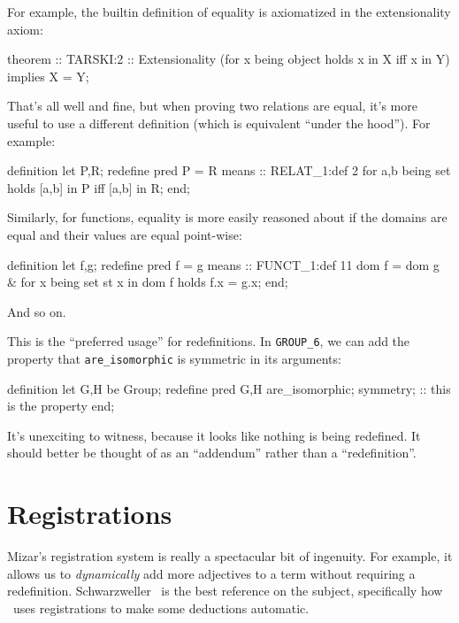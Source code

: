 \begin{node}[Redefinitions]
\begin{node}\label{mizar-001Q}%
For example, the builtin definition of equality is axiomatized in the
extensionality axiom:
\begin{mizar}
theorem :: TARSKI:2 :: Extensionality
  (for x being object holds x in X iff x in Y) implies X = Y;
\end{mizar}
That's all well and fine, but when proving two relations are equal, it's
more useful to use a different definition (which is equivalent ``under
the hood''). For example:
\begin{mizar}
definition
  let P,R;
  redefine pred P = R means
:: RELAT_1:def 2
  for a,b being set holds [a,b] in P iff [a,b] in R;
end;
\end{mizar}
Similarly, for functions, equality is more easily reasoned about if the
domains are equal and their values are equal point-wise:
\begin{mizar}
definition
  let f,g;
  redefine pred f = g means
:: FUNCT_1:def 11
  dom f = dom g
  & for x being set st x in dom f holds f.x = g.x;
end;
\end{mizar}
And so on.
\end{node}

\begin{node}\label{mizar-001R}%
This is the ``preferred usage'' for redefinitions. In \verb|GROUP_6|, we
can add the property that \verb|are_isomorphic| is symmetric in its
arguments:
\begin{mizar}
definition
  let G,H be Group;
  redefine pred G,H are_isomorphic;
  symmetry; :: this is the property
end;
\end{mizar}
It's unexciting to witness, because it looks like nothing is being
redefined. It should better be thought of as an ``addendum'' rather than
a ``redefinition''.
\end{node}
\end{node}

\section{Registrations}

\begin{node}\label{mizar-001U}%
Mizar's registration system is really a spectacular bit of ingenuity. 
For example, it allows us to \emph{dynamically} add more adjectives to a
term without requiring a redefinition.
Schwarzweller~\cite{schwarzweller2007mizar} is the best reference on the
subject, specifically how \Mizar\ uses registrations to make some
deductions automatic.
\end{node}

